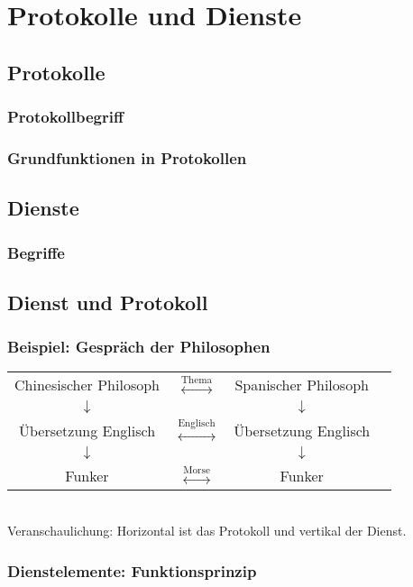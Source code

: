 \section{Protokolle und Dienste}
\subsection{Protokolle}
\subsubsection{Protokollbegriff}
\subsubsection{Grundfunktionen in Protokollen}
\subsection{Dienste}
\subsubsection{Begriffe}
\subsection{Dienst und Protokoll}
\subsubsection*{Beispiel: Gespräch der Philosophen}
\begin{tabular}{c c c r}
Chinesischer Philosoph & $\overset{\text{Thema}}{\longleftrightarrow}$ & Spanischer Philosoph\\
$\downarrow$ &  &  $\downarrow$\\
Übersetzung Englisch & $\overset{\text{Englisch}}{\longleftrightarrow}$ & Übersetzung Englisch\\
$\downarrow$ & & $\downarrow$\\
Funker & $\overset{\text{Morse}}{\longleftrightarrow}$ & Funker
\end{tabular}\\
Veranschaulichung: Horizontal ist das Protokoll und vertikal der Dienst.
\subsubsection{Dienstelemente: Funktionsprinzip}
